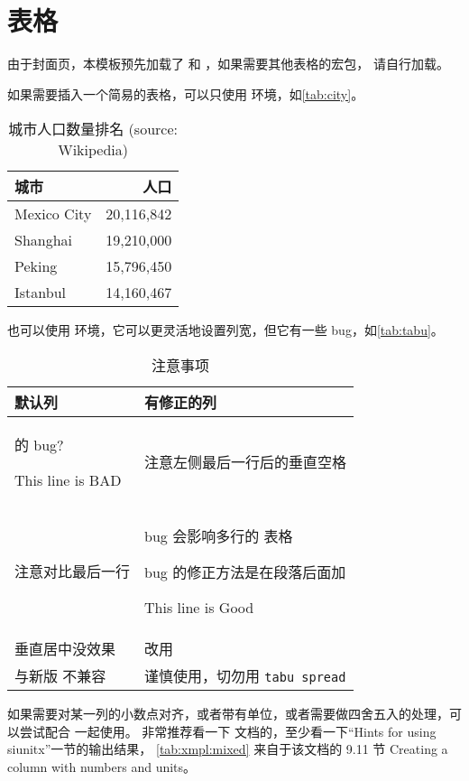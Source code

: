 \section{表格}

由于封面页，本模板预先加载了  和 ，如果需要其他表格的宏包，
请自行加载。

如果需要插入一个简易的表格，可以只使用  环境，如\autoref{tab:city}。
\begin{table}[htb]
  \caption[城市人口]{城市人口数量排名 (source: Wikipedia)\label{tab:city}}
  \begin{tabular}{lr}
    \toprule
    城市 & 人口 \\
    \midrule
    Mexico City & 20,116,842\\
    Shanghai & 19,210,000\\
    Peking & 15,796,450\\
    Istanbul & 14,160,467\\
    \bottomrule
  \end{tabular}
\end{table}

也可以使用  环境，它可以更灵活地设置列宽，但它有一些 bug，如\autoref{tab:tabu}。
\begin{table}[htb]
  \caption{ 注意事项 \label{tab:tabu}}
  \begin{tabu} to .9 \toprule
    默认列 & 有修正的列 \\ \midrule
     的 bug? \par This line is BAD & 注意左侧最后一行后的垂直空格 \\ \midrule
    注意对比最后一行 &
      bug 会影响多行的  表格 \par
      bug 的修正方法是在段落后面加  \par
      This line is Good \\ \midrule
    垂直居中没效果 & 改用  \\ \midrule
    与新版  不兼容 & 谨慎使用，切勿用 \texttt{tabu spread} \\ \bottomrule
  \end{tabu}
\end{table}

如果需要对某一列的小数点对齐，或者带有单位，或者需要做四舍五入的处理，可以尝试配合  一起使用。
非常推荐看一下  文档的，至少看一下“Hints for using siunitx”一节的输出结果，
\autoref{tab:xmpl:mixed} 来自于该文档的 9.11 节 Creating a column with numbers and units。

